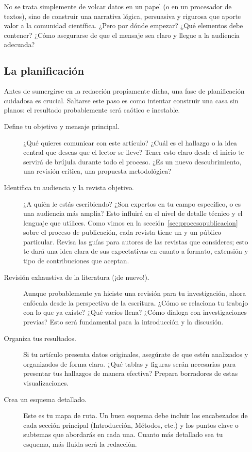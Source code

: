 No se trata simplemente de volcar datos en un papel (o en un procesador de textos), sino de construir una narrativa lógica, persuasiva y rigurosa que aporte valor a la comunidad científica.
¿Pero por dónde empezar?
¿Qué elementos debe contener?
¿Cómo asegurarse de que el mensaje sea claro y llegue a la audiencia adecuada?

\subsection*{La planificación}
\label{sub:planificacionarticulo}

Antes de sumergirse en la redacción propiamente dicha, una fase de planificación cuidadosa es crucial.
Saltarse este paso es como intentar construir una casa sin planos: el resultado probablemente será caótico e inestable.

\begin{description} \item[Define tu objetivo y mensaje principal.] ¿Qué quieres comunicar con este artículo?
	      ¿Cuál es el hallazgo o la idea central que deseas que el lector se lleve?
	      Tener esto claro desde el inicio te servirá de brújula durante todo el proceso.
	      ¿Es un nuevo descubrimiento, una revisión crítica, una propuesta metodológica?

	\item[Identifica tu audiencia y la revista objetivo.] ¿A quién le estás escribiendo?
	      ¿Son expertos en tu campo específico, o es una audiencia más amplia?
	      Esto influirá en el nivel de detalle técnico y el lenguaje que utilices.
	      Como vimos en la sección~\ref{sec:procesopublicacion} sobre el proceso de publicación, cada revista tiene un  y un público particular.
	      Revisa las guías para autores de las revistas que consideres; esto te dará una idea clara de sus expectativas en cuanto a formato, extensión y tipo de contribuciones que aceptan.

	\item[Revisión exhaustiva de la literatura (¡de nuevo!).] Aunque probablemente ya hiciste una revisión para tu investigación, ahora enfócala desde la perspectiva de la escritura.
	      ¿Cómo se relaciona tu trabajo con lo que ya existe?
	      ¿Qué vacíos llena?
	      ¿Cómo dialoga con investigaciones previas?
	      Esto será fundamental para la introducción y la discusión.

	\item[Organiza tus resultados.] Si tu artículo presenta datos originales, asegúrate de que estén analizados y organizados de forma clara.
	      ¿Qué tablas y figuras serán necesarias para presentar tus hallazgos de manera efectiva?
	      Prepara borradores de estas visualizaciones.

	\item[Crea un esquema detallado.] Este es tu mapa de ruta.
	      Un buen esquema debe incluir los encabezados de cada sección principal (Introducción, Métodos, etc.) y los puntos clave o subtemas que abordarás en cada una.
	      Cuanto más detallado sea tu esquema, más fluida será la redacción.
\end{description}


